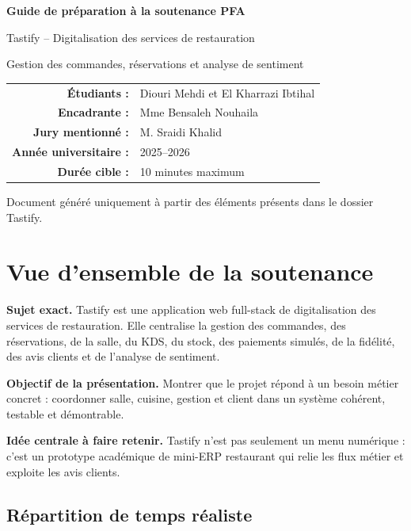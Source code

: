 \documentclass[11pt,a4paper]{article}
\begin{document}
\begin{titlepage}
\centering
\vspace*{2cm}
{\Huge\bfseries Guide de préparation à la soutenance PFA\par}
\vspace{0.8cm}
{\Large Tastify -- Digitalisation des services de restauration\par}
\vspace{0.5cm}
{\large Gestion des commandes, réservations et analyse de sentiment\par}
\vfill
\begin{tabular}{rl}
\textbf{Étudiants :} & Diouri Mehdi et El Kharrazi Ibtihal\\
\textbf{Encadrante :} & Mme Bensaleh Nouhaila\\
\textbf{Jury mentionné :} & M. Sraidi Khalid\\
\textbf{Année universitaire :} & 2025--2026\\
\textbf{Durée cible :} & 10 minutes maximum
\end{tabular}
\vfill
{\small Document généré uniquement à partir des éléments présents dans le dossier Tastify.}
\end{titlepage}

\tableofcontents
\newpage

\section{Vue d'ensemble de la soutenance}

\textbf{Sujet exact.} Tastify est une application web full-stack de digitalisation des services de restauration. Elle centralise la gestion des commandes, des réservations, de la salle, du KDS, du stock, des paiements simulés, de la fidélité, des avis clients et de l'analyse de sentiment.

\textbf{Objectif de la présentation.} Montrer que le projet répond à un besoin métier concret : coordonner salle, cuisine, gestion et client dans un système cohérent, testable et démontrable.

\textbf{Idée centrale à faire retenir.} Tastify n'est pas seulement un menu numérique : c'est un prototype académique de mini-ERP restaurant qui relie les flux métier et exploite les avis clients.

\subsection*{Répartition de temps réaliste}
\end{document}

